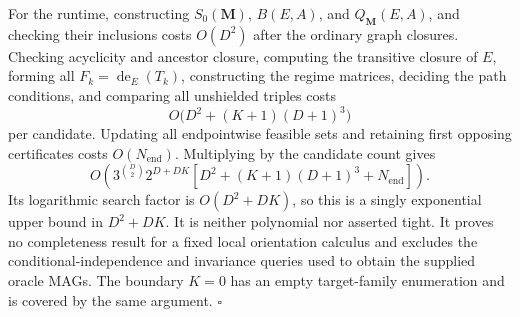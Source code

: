 For the runtime, constructing \(S_0(\mathbf M)\), \(B(E,A)\), and \(Q_{\mathbf M}(E,A)\), and checking their inclusions costs \(O(D^2)\) after the ordinary graph closures.  Checking acyclicity and ancestor closure, computing the transitive closure of \(E\), forming all \(F_k=\operatorname{de}_E(T_k)\), constructing the regime matrices, deciding the path conditions, and comparing all unshielded triples costs
\[
O\bigl(D^2+(K+1)(D+1)^3\bigr)
\]
per candidate.  Updating all endpointwise feasible sets and retaining first opposing certificates costs \(O(N_{\mathrm{end}})\).  Multiplying by the candidate count gives
\[
O\!\left(
3^{\binom D2}2^{D+DK}
\left[D^2+(K+1)(D+1)^3+N_{\mathrm{end}}\right]
\right).
\]
Its logarithmic search factor is \(O(D^2+DK)\), so this is a singly exponential upper bound in \(D^2+DK\).  It is neither polynomial nor asserted tight.  It proves no completeness result for a fixed local orientation calculus and excludes the conditional-independence and invariance queries used to obtain the supplied oracle MAGs.  The boundary \(K=0\) has an empty target-family enumeration and is covered by the same argument. \(\square\)